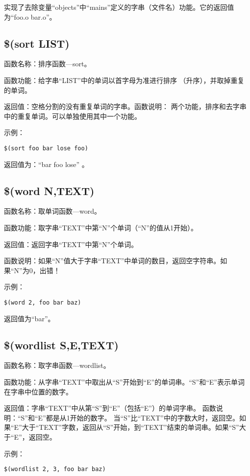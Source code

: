 实现了去除变量“objects”中“mains”定义的字串（文件名）功能。它的返回值为“foo.o
bar.o”。

\subsection{\$(sort LIST)}

函数名称：排序函数—sort。

函数功能：给字串“LIST”中的单词以首字母为准进行排序
（升序），并取掉重复的单词。

返回值：空格分割的没有重复单词的字串。函数说明：
两个功能，排序和去字串中的重复单词。可以单独使用其中一个功能。

示例：
\begin{Verbatim}[]
$(sort foo bar lose foo)
\end{Verbatim}

返回值为：“bar foo lose” 。

\subsection{\$(word N,TEXT)}

函数名称：取单词函数—word。

函数功能：取字串“TEXT”中第“N”个单词（“N”的值从1开始）。

返回值：返回字串“TEXT”中第“N”个单词。

函数说明：如果“N”值大于字串“TEXT”中单词的数目，返回空字符串。如果“N”为0，出错！

示例：

\begin{Verbatim}[]
$(word 2, foo bar baz)
\end{Verbatim}
返回值为“bar”。

\subsection{\$(wordlist S,E,TEXT)}

函数名称：取字串函数—wordlist。

函数功能：从字串“TEXT”中取出从“S”开始到“E”的单词串。“S”和“E”表示单词在字串中位置的数字。

返回值：字串“TEXT”中从第“S”到“E”（包括“E”）的单词字串。
函数说明：“S”和“E”都是从1开始的数字。
当“S”比“TEXT”中的字数大时，返回空。如果“E”大于“TEXT”字数，返回从“S”开始，到“TEXT”结束的单词串。如果“S”大于“E”，返回空。

示例：

\begin{Verbatim}[]
$(wordlist 2, 3, foo bar baz)
\end{Verbatim}

